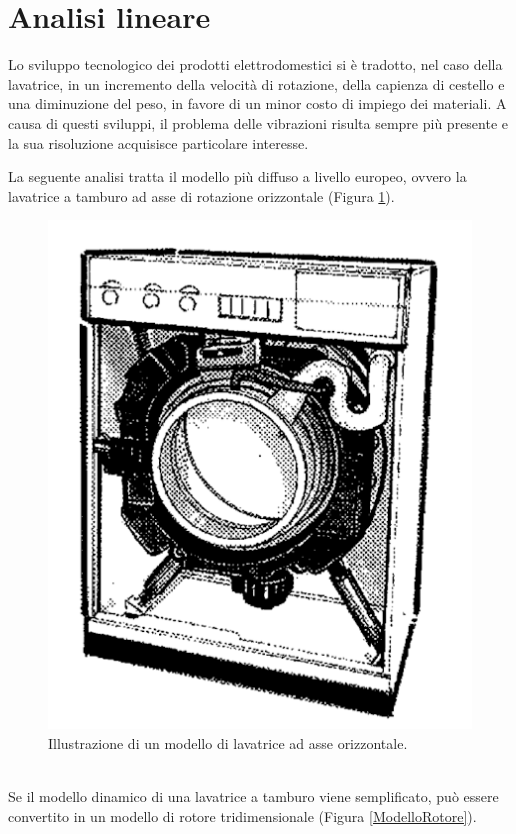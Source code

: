 \section{Analisi lineare}
Lo sviluppo tecnologico dei prodotti elettrodomestici si è tradotto, nel caso della lavatrice, in un incremento della velocità di rotazione, della capienza di cestello e una diminuzione del peso, in favore di un minor costo di impiego dei materiali. A causa di questi sviluppi, il problema delle vibrazioni risulta sempre più presente e la sua risoluzione acquisisce particolare interesse.

La seguente analisi tratta il modello più diffuso a livello europeo, ovvero la lavatrice a tamburo ad asse di rotazione orizzontale (Figura \ref{LavatriceAsseOrizzontale}).
\begin{figure}[h]
    \centering
    \includegraphics[scale=0.5]{Immagini/LavatriceOrizzontale.png}
    \caption{Illustrazione di un modello di lavatrice ad asse orizzontale.}
    \label{LavatriceAsseOrizzontale}
\end{figure}\\
Se il modello dinamico di una lavatrice a tamburo viene semplificato, può essere convertito in un modello di rotore tridimensionale (Figura \ref{ModelloRotore})\cite{choi2003study}.
